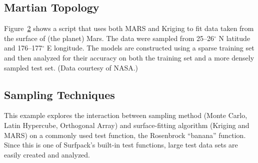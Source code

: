\documentclass{article}
\begin{document}
\begin{figure}[htbp]
  \centering
  \begin{bigbox}
	\begin{small}
	
 	\end{small}
  \end{bigbox}
   \label{fig:test_scores2}
\end{figure}

\pagebreak
\subsection {Martian Topology}

Figure~\ref{fig:topology} shows a script that uses both MARS and Kriging to fit data taken from the surface of (the planet) Mars.  The data were sampled from 25--26$^{\circ}$ N latitude and 176--177$^{\circ}$ E longitude. The models are constructed using a sparse training set and then analyzed for their accuracy on both the training set and a more densely sampled test set.  (Data courtesy of NASA.)

\begin{figure}[htbp]
  \centering
  \begin{bigbox}
	\begin{small}
	
 	\end{small}
  \end{bigbox}
   \label{fig:topology}
\end{figure}

\pagebreak
\subsection {Sampling Techniques}

This example explores the interaction between sampling method (Monte Carlo, Latin Hypercube, Orthogonal Array) and surface-fitting algorithm (Kriging and MARS) on a commonly used test function, the Rosenbrock ``banana'' function.  Since this is one of Surfpack's built-in test functions, large test data sets are easily created and analyzed.

\begin{figure}[htbp]
  \centering
  \begin{bigbox}
	\begin{small}
	
 	\end{small}
  \end{bigbox}
   \label{fig:sampling}
\end{figure}
\end{document}
